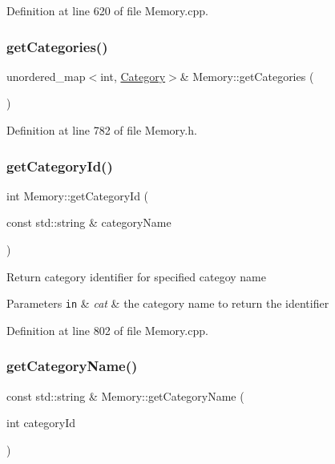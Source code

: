 Definition at line 620 of file Memory.\+cpp.

\mbox{\label{class_memory_a51f0f9c3a202dd21c9dbae0dbeadaf68}} 
\subsubsection{\texorpdfstring{get\+Categories()}{getCategories()}}
{\footnotesize\ttfamily unordered\+\_\+map$<$int, \hyperlink{class_category}{Category}$>$\& Memory\+::get\+Categories (\begin{DoxyParamCaption}{ }\end{DoxyParamCaption})\hspace{0.3cm}{\ttfamily [inline]}}



Definition at line 782 of file Memory.\+h.

\mbox{\label{class_memory_a239bd8dc977f6dff458b3973e1dd4bb2}} 
\subsubsection{\texorpdfstring{get\+Category\+Id()}{getCategoryId()}}
{\footnotesize\ttfamily int Memory\+::get\+Category\+Id (\begin{DoxyParamCaption}\item[{const std\+::string \&}]{category\+Name }\end{DoxyParamCaption})}

Return category identifier for specified categoy name


\begin{DoxyParams}[1]{Parameters}
\mbox{\tt in}  & {\em cat} & the category name to return the identifier \\
\hline
\end{DoxyParams}


Definition at line 802 of file Memory.\+cpp.

\mbox{\label{class_memory_a80ad5f670ba87f74c170e5623f8eefc6}} 
\subsubsection{\texorpdfstring{get\+Category\+Name()}{getCategoryName()}}
{\footnotesize\ttfamily const std\+::string \& Memory\+::get\+Category\+Name (\begin{DoxyParamCaption}\item[{int}]{category\+Id }\end{DoxyParamCaption})}



